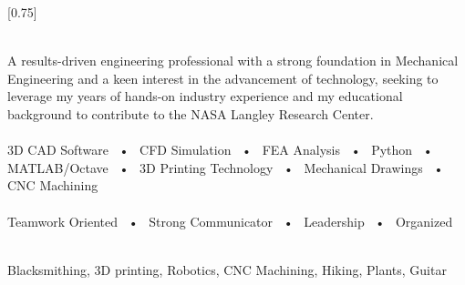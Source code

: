 \documentclass[allblack]{simplehipstercv}
\begin{document}
\setlength{\columnsep}{2cm}
[0.75]
\begin{paracol}{2}


\paracolbackgroundoptions


\footnotesize
{\setasidefontcolour
\flushleft
{}\\[0.5em]
    {\footnotesize
    A results-driven engineering
    professional with a strong
    foundation in Mechanical Engineering
    and a keen interest in the
    advancement of technology,
    seeking to leverage my years of
    hands-on industry experience and
    my educational background to
    contribute to the NASA Langley Research Center.}\\
\bigskip
{} \\[0.5em]

    3D CAD Software ~•~ CFD Simulation ~•~ FEA Analysis ~•~ Python ~•~ MATLAB/Octave ~•~ 3D Printing Technology ~•~ Mechanical Drawings ~•~ CNC Machining\\

\bigskip
{} \\[0.5em]

    Teamwork Oriented ~•~ Strong Communicator ~•~ Leadership ~•~ Organized \\

\bigskip

\\[0.5em]

Blacksmithing, 3D printing, Robotics, CNC Machining,
Hiking, Plants, Guitar\\
\bigskip


}
\switchcolumn

\end{paracol}
\end{document}
